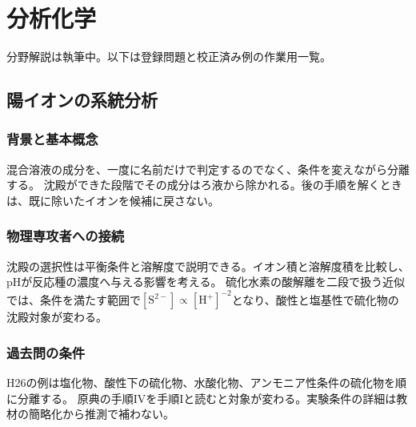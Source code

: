 \chapter{分析化学}
\noindent 分野解説は執筆中。以下は登録問題と校正済み例の作業用一覧。
\section{陽イオンの系統分析}
\subsection{背景と基本概念}
混合溶液の成分を、一度に名前だけで判定するのでなく、条件を変えながら分離する。
沈殿ができた段階でその成分はろ液から除かれる。後の手順を解くときは、既に除いたイオンを候補に戻さない。
\subsection{物理専攻者への接続}
沈殿の選択性は平衡条件と溶解度で説明できる。イオン積と溶解度積を比較し、pHが反応種の濃度へ与える影響を考える。
硫化水素の酸解離を二段で扱う近似では、条件を満たす範囲で$[\mathrm{S}^{2-}]\propto[\mathrm{H}^+]^{-2}$となり、酸性と塩基性で硫化物の沈殿対象が変わる。
\subsection{過去問の条件}
H26の例は塩化物、酸性下の硫化物、水酸化物、アンモニア性条件の硫化物を順に分離する。
原典の手順IVを手順Iと読むと対象が変わる。実験条件の詳細は教材の簡略化から推測で補わない\cite{qualitative_stanford}。


